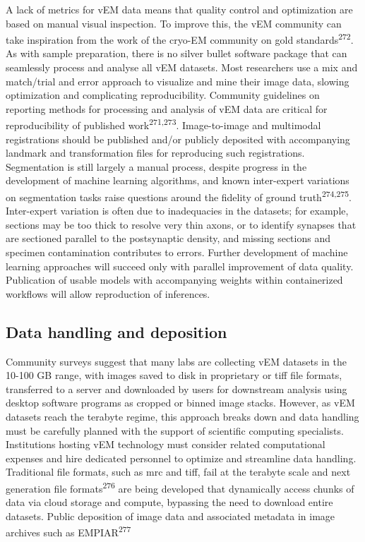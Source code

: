 \documentclass{article}
\begin{document}
A lack of metrics for vEM data means that quality control and optimization are based on manual visual inspection. To improve this, the vEM community can take inspiration from the work of the cryo-EM community on gold standards\textsuperscript{272}. As with sample preparation, there is no silver bullet software package that can seamlessly process and analyse all vEM datasets. Most researchers use a mix and match/trial and error approach to visualize and mine their image data, slowing optimization and complicating reproducibility. Community guidelines on reporting methods for processing and analysis of vEM data are critical for reproducibility of published work\textsuperscript{271,273}. Image-to-image and multimodal registrations should be published and/or publicly deposited with accompanying landmark and transformation files for reproducing such registrations. Segmentation is still largely a manual process, despite progress in the development of machine learning algorithms, and known inter-expert variations on segmentation tasks raise questions around the fidelity of ground truth\textsuperscript{274,275}. Inter-expert variation is often due to inadequacies in the datasets; for example, sections may be too thick to resolve very thin axons, or to identify synapses that are sectioned parallel to the postsynaptic density, and missing sections and specimen contamination contributes to errors. Further development of machine learning approaches will succeed only with parallel improvement of data quality. Publication of usable models with accompanying weights within containerized workflows will allow reproduction of inferences.

\subsection*{Data handling and deposition}

Community surveys suggest that many labs are collecting vEM datasets in the 10-100 GB range, with images saved to disk in proprietary or tiff file formats, transferred to a server and downloaded by users for downstream analysis using desktop software programs as cropped or binned image stacks. However, as vEM datasets reach the terabyte regime, this approach breaks down and data handling must be carefully planned with the support of scientific computing specialists. Institutions hosting vEM technology must consider related computational expenses and hire dedicated personnel to optimize and streamline data handling. Traditional file formats, such as mrc and tiff, fail at the terabyte scale and next generation file formats\textsuperscript{276} are being developed that dynamically access chunks of data via cloud storage and compute, bypassing the need to download entire datasets. Public deposition of image data and associated metadata in image archives such as EMPIAR\textsuperscript{277}
\end{document}
